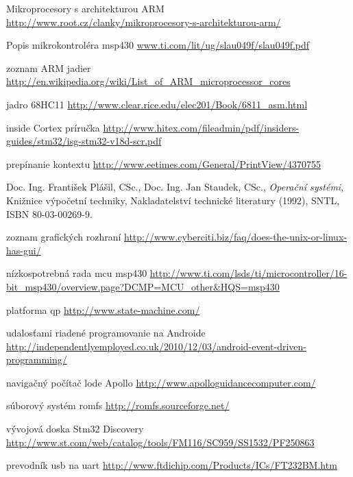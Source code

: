 \begin{thebibliography}{99}                                \label{literatura}

Mikroprocesory s architekturou ARM
\url{http://www.root.cz/clanky/mikroprocesory-s-architekturou-arm/}

Popis mikrokontroléra msp430
\url{www.ti.com/lit/ug/slau049f/slau049f.pdf}

zoznam ARM jadier
\url{http://en.wikipedia.org/wiki/List_of_ARM_microprocessor_cores}

jadro 68HC11
\url{http://www.clear.rice.edu/elec201/Book/6811_asm.html}


inside Cortex príručka
\url{http://www.hitex.com/fileadmin/pdf/insiders-guides/stm32/isg-stm32-v18d-scr.pdf}



prepínanie kontextu
\url{http://www.eetimes.com/General/PrintView/4370755}

Doc. Ing. František Plášil, CSc., Doc. Ing. Jan Staudek, CSc., 
{\it Operační systémi}, 
Knižnice výpočetní techniky, 
Nakladatelství technické literatury (1992), 
SNTL, ISBN 80-03-00269-9.


zoznam grafických rozhraní
\url{http://www.cyberciti.biz/faq/does-the-unix-or-linux-has-gui/}

nízkospotrebná rada mcu msp430
\url{http://www.ti.com/lsds/ti/microcontroller/16-bit_msp430/overview.page?DCMP=MCU_other&HQS=msp430}

platforma qp
\url{http://www.state-machine.com/}

udalosťami riadené programovanie na Androide
\url{http://independentlyemployed.co.uk/2010/12/03/android-event-driven-programming/}

navigačný počítač lode Apollo
\url{http://www.apolloguidancecomputer.com/}


súborový systém romfs
\url{http://romfs.sourceforge.net/}


vývojová doska Stm32 Discovery
\url{http://www.st.com/web/catalog/tools/FM116/SC959/SS1532/PF250863}

prevodník usb na uart
\url{http://www.ftdichip.com/Products/ICs/FT232BM.htm}


\end{thebibliography}
